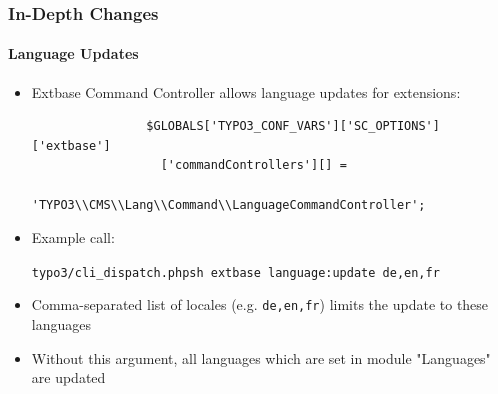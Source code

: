 
\begin{frame}[fragile]
	\frametitle{In-Depth Changes}
	\framesubtitle{Language Updates}

	\begin{itemize}
		\item Extbase Command Controller allows language updates for extensions:

			\begin{lstlisting}
				$GLOBALS['TYPO3_CONF_VARS']['SC_OPTIONS']['extbase']
				  ['commandControllers'][] =
				  'TYPO3\\CMS\\Lang\\Command\\LanguageCommandController';
			\end{lstlisting}

		\item Example call:

			\lstinline!typo3/cli_dispatch.phpsh extbase language:update de,en,fr!

		\item Comma-separated list of locales (e.g. \texttt{de,en,fr}) limits the update to these languages
		\item Without this argument, all languages which are set in module "Languages" are updated

	\end{itemize}

\end{frame}


